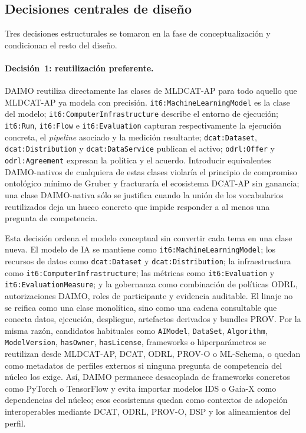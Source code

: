 \documentclass[Afour,sagev,times]{sagej}
\newcommand{\code}[1]{\texttt{#1}}
\begin{document}
\subsection{Decisiones centrales de diseño}\label{sec:method-design}

Tres decisiones estructurales se tomaron en la fase de conceptualización y condicionan el resto del diseño.

\paragraph{Decisión~1: reutilización preferente.} DAIMO reutiliza directamente las clases de MLDCAT-AP para todo aquello que MLDCAT-AP ya modela con precisión. \code{it6:MachineLearningModel} es la clase del modelo; \code{it6:ComputerInfrastructure} describe el entorno de ejecución; \code{it6:Run}, \code{it6:Flow} e \code{it6:Evaluation} capturan respectivamente la ejecución concreta, el \emph{pipeline} asociado y la medición resultante; \code{dcat:Dataset}, \code{dcat:Distribution} y \code{dcat:DataService} publican el activo; \code{odrl:Offer} y \code{odrl:Agreement} expresan la política y el acuerdo. Introducir equivalentes DAIMO-nativos de cualquiera de estas clases violaría el principio de compromiso ontológico mínimo de Gruber y fracturaría el ecosistema DCAT-AP sin ganancia; una clase DAIMO-nativa sólo se justifica cuando la unión de los vocabularios reutilizados deja un hueco concreto que impide responder a al menos una pregunta de competencia.

Esta decisión ordena el modelo conceptual sin convertir cada tema en una clase nueva. El modelo de IA se mantiene como \code{it6:MachineLearningModel}; los recursos de datos como \code{dcat:Dataset} y \code{dcat:Distribution}; la infraestructura como \code{it6:ComputerInfrastructure}; las métricas como \code{it6:Evaluation} y \code{it6:EvaluationMeasure}; y la gobernanza como combinación de políticas ODRL, autorizaciones DAIMO, roles de participante y evidencia auditable. El linaje no se reifica como una clase monolítica, sino como una cadena consultable que conecta datos, ejecución, despliegue, artefactos derivados y bundles PROV. Por la misma razón, candidatos habituales como \code{AIModel}, \code{DataSet}, \code{Algorithm}, \code{ModelVersion}, \code{hasOwner}, \code{hasLicense}, frameworks o hiperparámetros se reutilizan desde MLDCAT-AP, DCAT, ODRL, PROV-O o ML-Schema, o quedan como metadatos de perfiles externos si ninguna pregunta de competencia del núcleo los exige. Así, DAIMO permanece desacoplada de frameworks concretos como PyTorch o TensorFlow y evita importar modelos IDS o Gaia-X como dependencias del núcleo; esos ecosistemas quedan como contextos de adopción interoperables mediante DCAT, ODRL, PROV-O, DSP y los alineamientos del perfil.
\end{document}
